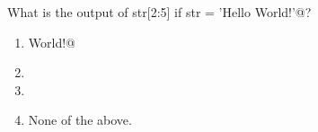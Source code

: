 \question
What is the output of \lstinline@print str[2:5] if str = 'Hello World!'@?

\begin{enumerate}
\item \lstinline@llo World!@
\item \lstinline@H@
\item \lstinline@llo@
\item None of the above.
\end{enumerate}

